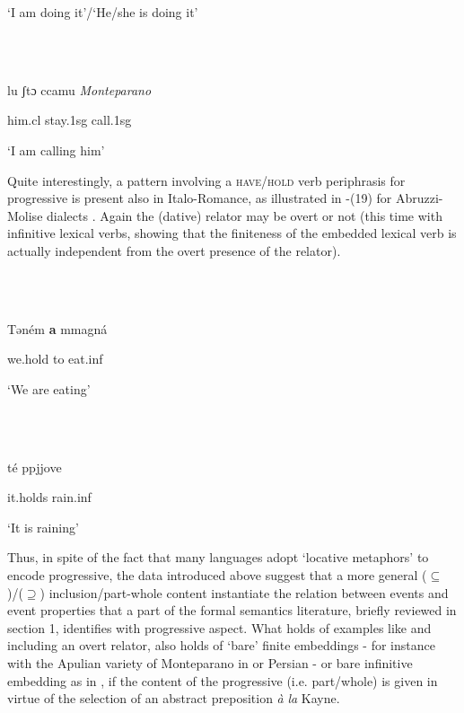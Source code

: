 \documentclass[output=paper]{langsci/langscibook}
\begin{document}
‘I am doing it’/‘He/she is doing it’

\ea%
    \label{ex:key:17}
    \gll\\
        \\
    \glt
    \z

          lu   ʃtɔ   ccamu         \textit{Monteparano} 

him.cl stay.1sg   call.1sg 

‘I am calling him’      

Quite interestingly, a pattern involving a \textsc{have/hold} verb periphrasis for progressive is present also in Italo-Romance, as illustrated in -(19) for Abruzzi-Molise dialects \citep[555]{Cinque2017}. Again the (dative) relator may be overt  or not  (this time with infinitive lexical verbs, showing that the finiteness of the embedded lexical verb is actually independent from the overt presence of the relator). 

\ea%
    \label{ex:key:18}
    \gll\\
        \\
    \glt
    \z

             Təném   \textbf{a}   mmagná  \citep[133]{Rohlfs1969}

we.hold   to   eat.inf      

‘We are eating’ 

\ea%
    \label{ex:key:19}
    \gll\\
        \\
    \glt
    \z

            té     ppjjove     \citep[266]{Ledgeway2016} 

it.holds   rain.inf

‘It is raining’

Thus, in spite of the fact that many languages adopt ‘locative metaphors’ to encode progressive, the data introduced above suggest that a more general (${\subseteq}$)/(${\supseteq}$) inclusion/part-whole content instantiate the relation between events and event properties that a part of the formal semantics literature, briefly reviewed in section 1, identifies with progressive aspect.\textsuperscript{} What holds of examples like  and  including an overt relator, also holds of ‘bare’ finite embeddings - for instance with the Apulian variety of Monteparano in  or Persian  - or bare infinitive embedding as in , if the content of the progressive (i.e. part/whole) is given in virtue of the selection of an abstract preposition \textit{à} \textit{la} Kayne. 
\end{document}
